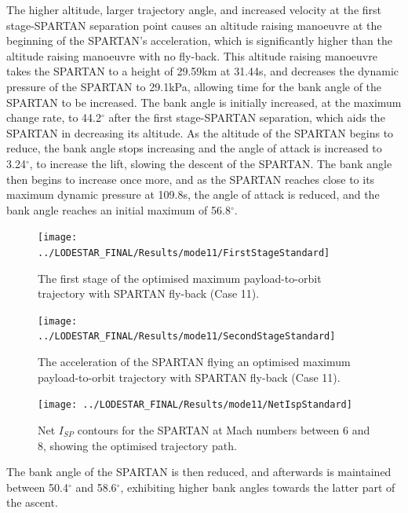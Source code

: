  The higher altitude, larger trajectory angle, and increased velocity at the first stage-SPARTAN separation point causes an altitude raising manoeuvre at the beginning of the SPARTAN's acceleration, which is significantly higher than the altitude raising manoeuvre with no fly-back. This altitude raising manoeuvre takes the SPARTAN to a height of 29.59km at 31.44s, and decreases the dynamic pressure of the SPARTAN to 29.1kPa, allowing time for the bank angle of the SPARTAN to be increased. 
 The bank angle is initially increased, at the maximum change rate, to 44.2$^\circ$ after the first stage-SPARTAN separation, which aids the SPARTAN in decreasing its altitude. As the altitude of the SPARTAN begins to reduce, the bank angle stops increasing and the angle of attack is increased to 3.24$^\circ$, to increase the lift, slowing the descent of the SPARTAN. 
 The bank angle then begins to increase once more, and as the SPARTAN reaches close to its maximum dynamic pressure at 109.8s, the angle of attack is reduced, and the bank angle reaches an initial maximum of 56.8$^\circ$. 
\begin{figure}[ht!]
\centering
\texttt{[image: ../LODESTAR\_FINAL/Results/mode11/FirstStageStandard]}
\caption{The first stage of the optimised maximum payload-to-orbit trajectory with SPARTAN fly-back (Case 11). }
\label{fig:FirstStageStandard}
\end{figure}
\begin{figure}[ht!]
\centering
\texttt{[image: ../LODESTAR\_FINAL/Results/mode11/SecondStageStandard]}
\caption{The acceleration of the SPARTAN flying an optimised maximum payload-to-orbit trajectory with SPARTAN fly-back (Case 11). }
\label{fig:SecondStageStandard}
\end{figure}
\begin{figure}[ht!]
\centering
\texttt{[image: ../LODESTAR\_FINAL/Results/mode11/NetIspStandard]}
\caption{Net $I_{SP}$ contours for the SPARTAN at Mach numbers between 6 and 8, showing the optimised trajectory path. }
\label{fig:NetIspStandard}
\end{figure}
The bank angle of the SPARTAN is then reduced, and afterwards is maintained between 50.4$^\circ$ and 58.6$^\circ$, exhibiting higher bank angles towards the latter part of the ascent. 

